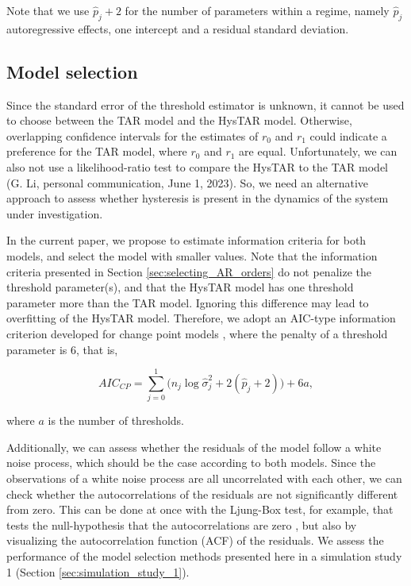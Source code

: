 \documentclass{article}
\begin{document}
Note that we use $\hat{p}_j + 2$ for the number of parameters within a regime, namely $\hat{p}_j$ autoregressive effects, one intercept and a residual standard deviation.

\subsection{Model selection} \label{sec:model_selection}
Since the standard error of the threshold estimator is unknown, it cannot be used to choose between the TAR model and the HysTAR model.
Otherwise, overlapping confidence intervals for the estimates of $r_0$ and $r_1$ could indicate a preference for the TAR model, where $r_0$ and $r_1$ are equal.
Unfortunately, we can also not use a likelihood-ratio test to compare the HysTAR to the TAR model (G. Li, personal communication, June 1, 2023).
So, we need an alternative approach to assess whether hysteresis is present in the dynamics of the system under investigation.

In the current paper, we propose to estimate information criteria for both models, and select the model with smaller values.
Note that the information criteria presented in Section \ref{sec:selecting_AR_orders} do not penalize the threshold parameter(s), and that the HysTAR model has one threshold parameter more than the TAR model.
Ignoring this difference may lead to overfitting of the HysTAR model.
Therefore, we adopt an AIC-type information criterion developed for change point models \citep[AICcp][]{aiccp}, where the penalty of a threshold parameter is 6, that is,

\begin{equation}
\label{eq:aiccp}
AIC_{CP} = \sum_{j = 0}^{1} \Big(n_j \log \hat{\sigma}_{j}^2 + 2(\hat{p}_j + 2) \Big) + 6a,
\end{equation}

\noindent where $a$ is the number of thresholds.

Additionally, we can assess whether the residuals of the model follow a white noise process, which should be the case according to both models.
Since the observations of a white noise process are all uncorrelated with each other, we can check whether the autocorrelations of the residuals are not significantly different from zero.
This can be done at once with the Ljung-Box test, for example, that tests the null-hypothesis that the autocorrelations are zero \citep{ljungbox}, but also by visualizing the autocorrelation function (ACF) of the residuals.
We assess the performance of the model selection methods presented here in a simulation study 1 (Section \ref{sec:simulation_study_1}).
\end{document}
